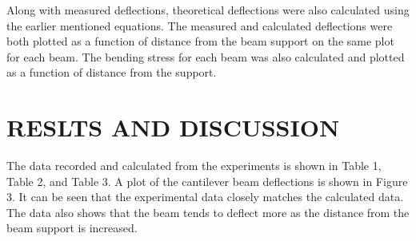 \documentclass[12pt]{article}
\begin{document}
Along with measured deflections, theoretical deflections were also calculated using the earlier mentioned equations. The measured and calculated deflections were both plotted as a function of distance from the beam support on the same plot for each beam. The bending stress for each beam was also calculated and plotted as a function of distance from the support. 
\bigskip


\section*{\fontsize{12}{12}\selectfont RESLTS AND DISCUSSION}
The data recorded and calculated from the experiments is shown in Table 1, Table 2, and Table 3. A plot of the cantilever beam deflections is shown in Figure 3. It can be seen that the experimental data closely matches the calculated data. The data also shows that the beam tends to deflect more as the distance from the beam support is increased.

\newpage
\end{document}
